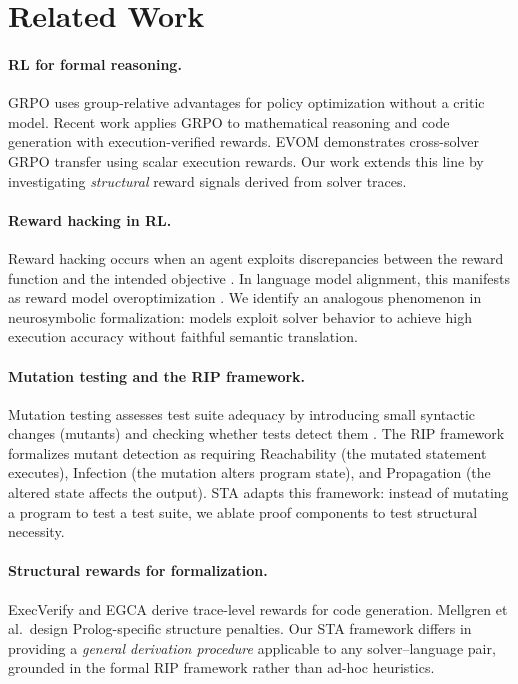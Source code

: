 \documentclass[11pt,a4paper]{article}
\begin{document}
\section{Related Work}

\paragraph{RL for formal reasoning.}
GRPO \cite{shao2024deepseek} uses group-relative advantages for policy optimization without a critic model.
Recent work applies GRPO to mathematical reasoning and code generation with execution-verified rewards.
EVOM demonstrates cross-solver GRPO transfer using scalar execution rewards.
Our work extends this line by investigating \emph{structural} reward signals derived from solver traces.

\paragraph{Reward hacking in RL.}
Reward hacking occurs when an agent exploits discrepancies between the reward function and the intended objective \cite{skalse2022defining}.
In language model alignment, this manifests as reward model overoptimization \cite{gao2023scaling}.
We identify an analogous phenomenon in neurosymbolic formalization: models exploit solver behavior to achieve high execution accuracy without faithful semantic translation.

\paragraph{Mutation testing and the RIP framework.}
Mutation testing assesses test suite adequacy by introducing small syntactic changes (mutants) and checking whether tests detect them \cite{jia2011analysis}.
The RIP framework formalizes mutant detection as requiring Reachability (the mutated statement executes), Infection (the mutation alters program state), and Propagation (the altered state affects the output).
STA adapts this framework: instead of mutating a program to test a test suite, we ablate proof components to test structural necessity.

\paragraph{Structural rewards for formalization.}
ExecVerify and EGCA derive trace-level rewards for code generation.
Mellgren et al.\ design Prolog-specific structure penalties.
Our STA framework differs in providing a \emph{general derivation procedure} applicable to any solver--language pair, grounded in the formal RIP framework rather than ad-hoc heuristics.
\end{document}
